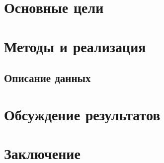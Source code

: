 \documentclass{spbau-diploma}
\begin{document}
\section{Основные цели}
\label{sec:goals}


\section{Методы и реализация}

\subsection{Описание данных}
\label{sec:data}


\label{sec:implementation}


\newpage
\section{Обсуждение результатов}
\label{sec:experiments}



\section{Заключение}
\label{sec:results}




\end{document}

